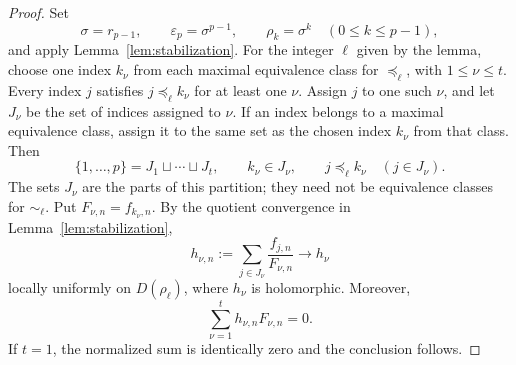 \documentclass[12pt,letterpaper,reqno]{amsart}
\theoremstyle{definition}
\numberwithin{equation}{section}
\begin{document}
\begin{proof}
    Set
    \[
        \sigma=r_{p-1},\qquad \varepsilon_p=\sigma^{p-1},
        \qquad \rho_k=\sigma^k\quad(0\le k\le p-1),
    \]
    and apply Lemma~\ref{lem:stabilization}. For the integer $\ell$
    given by the lemma, choose one index $k_\nu$ from each maximal
    equivalence class for $\preceq_\ell$, with $1\le\nu\le t$.
    Every index $j$ satisfies $j\preceq_\ell k_\nu$ for at least
    one $\nu$. Assign $j$ to one such $\nu$, and let $J_\nu$ be
    the set of indices assigned to $\nu$. If an index belongs to a
    maximal equivalence class, assign it to the same set as the chosen
    index $k_\nu$ from that class. Then
    \[
        \{1,\ldots,p\}=J_1\sqcup\cdots\sqcup J_t,
        \qquad k_\nu\in J_\nu,
        \qquad j\preceq_\ell k_\nu\quad(j\in J_\nu).
    \]
    The sets $J_\nu$ are the parts of this partition; they need not
    be equivalence classes for $\sim_\ell$.
    Put $F_{\nu,n}=f_{k_\nu,n}$. By the quotient convergence in
    Lemma~\ref{lem:stabilization},
    \[
        h_{\nu,n}:=\sum_{j\in J_\nu}\frac{f_{j,n}}{F_{\nu,n}}
        \longrightarrow h_\nu
    \]
    locally uniformly on $D(\rho_\ell)$, where $h_\nu$ is holomorphic.
    Moreover,
    \begin{equation}\label{eq:partition-identity}
        \sum_{\nu=1}^t h_{\nu,n}F_{\nu,n}=0.
    \end{equation}
    If $t=1$, the normalized sum is identically zero and the
    conclusion follows.


\end{proof}
\end{document}

